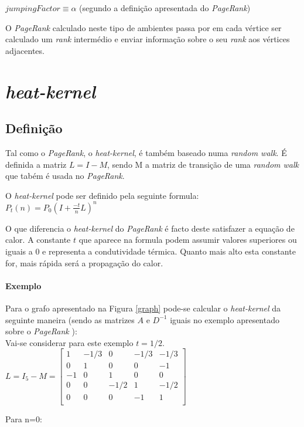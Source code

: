 \documentclass[a4paper,10pt]{report}
\begin{document}
  $jumpingFactor\equiv\alpha$ (segundo a definição apresentada do \textit{PageRank})
  
  O \textit{PageRank} calculado neste tipo de ambientes passa por em cada vértice ser calculado um \textit{rank} intermédio e enviar informação sobre o seu \textit{rank} aos vértices adjacentes.
  
\section*{\textit{heat-kernel}}

  \subsection*{Definição}
  
    Tal como o \textit{PageRank}, o \textit{heat-kernel}, é também baseado numa \textit{random walk}. 
    É  definida a matriz $L=I-M$, sendo M a matriz de transição de uma \textit{random walk} que tabém é usada no \textit{PageRank}.
    
    O \textit{heat-kernel} pode ser definido pela seguinte formula:\\
    $P_t(n)=P_0(I+\frac{-t}{n}L)^n$
    
  O que diferencia o \textit{heat-kernel} do \textit{PageRank} é  facto deste satisfazer a equação de calor. A constante $t$ que aparece na formula podem assumir valores superiores ou iguais a 0 e representa a condutividade térmica. Quanto mais alto esta constante for, mais rápida será a propagação do calor.  
    
  \paragraph{Exemplo}   
  Para o grafo apresentado na Figura \ref{graph} pode-se calcular o \textit{heat-kernel} da seguinte maneira (sendo as matrizes $A$ e $D^{{-}1}$ iguais no exemplo apresentado sobre o \textit{PageRank} ): \\[0.25cm]
  Vai-se considerar para este exemplo $t=1/2$. \\[0.25cm]
  $L = I_5 - M = \begin{bmatrix} 
		    1 & -1/3 & 0 & -1/3 & -1/3 \\
		    0 & 1 & 0 & 0 & -1 \\
		    -1 & 0 & 1 & 0 & 0\\
		    0 & 0 & -1/2 & 1 & -1/2\\
		    0 & 0 & 0 & -1 & 1\\
		 \end{bmatrix}$
  \\[0.25cm]
  \begin{bf}
    Para n=0:
  \end{bf}
  
\end{document}
